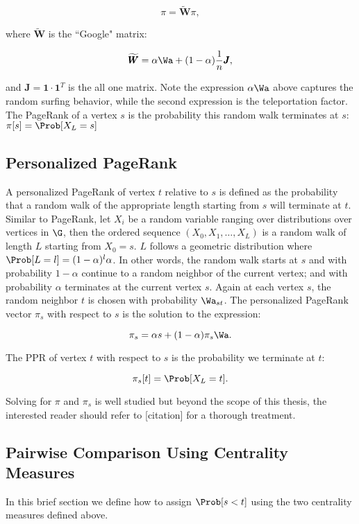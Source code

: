 	\[
		\pi = \widetilde{\pmb{W}} \pi,
	\]

where $\widetilde{\pmb{W}}$ is the ``Google" matrix:
	
	\[
		\widetilde{\pmb{W}} = \alpha \Wa + (1 - \alpha) \frac{1}{n} \pmb{J},
	\]

and $\pmb{J} = \pmb{1} \cdot \pmb{1}^T$ is the all one matrix. Note the expression $\alpha \Wa$ above captures the random surfing behavior, while the second expression is the teleportation factor. The PageRank of a vertex $s$ is the probability this random walk terminates at $s$: $\pi[s] = \Prob[X_L = s]$

\subsection{Personalized PageRank}

A personalized PageRank of vertex $t$ relative to $s$ is defined as the probability that a random walk of the appropriate length starting from $s$ will terminate at $t$. Similar to PageRank, let $X_i$ be a random variable ranging over distributions over vertices in $\G$, then the ordered sequence $(X_0, X_1,\ldots,X_L)$ is a random walk of length $L$ starting from $X_0 = s$. $L$ follows a geometric distribution where $\Prob[L = l] = (1 - \alpha)^l \alpha$. In other words, the random walk starts at $s$ and with probability $1 - \alpha$ continue to a random neighbor of the current vertex; and with probability $\alpha$ terminates at the current vertex $s$. Again at each vertex $s$, the random neighbor $t$ is chosen with probability $\Wa_{st}$. The personalized PageRank vector $\pi_s$ with respect to $s$ is the solution to the expression:

\[
	\pi_s = \alpha s + (1 - \alpha) \pi_s \Wa.
\]

The PPR of vertex $t$ with respect to $s$ is the probability we terminate at $t$:

	\[
		\pi_s[t] = \Prob[X_L = t].
	\]

Solving for $\pi$ and $\pi_s$ is well studied but beyond the scope of this thesis, the interested reader should refer to [citation] for a thorough treatment. 

\subsection{Pairwise Comparison Using Centrality Measures}

In this brief section we define how to assign $\Prob[s < t]$ using the two centrality measures defined above.

